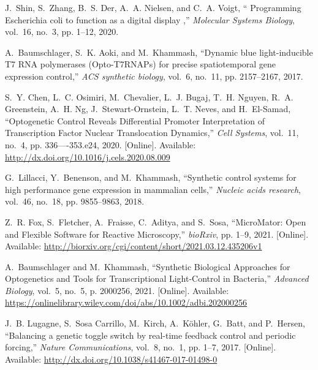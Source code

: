 \documentclass[12pt]{iopart}
\begin{document}
\begin{thebibliography}{10}
J.~Shin, S.~Zhang, B.~S. Der, A.~A. Nielsen, and C.~A. Voigt, ``{ Programming
  Escherichia coli to function as a digital display },'' \emph{Molecular
  Systems Biology}, vol.~16, no.~3, pp. 1--12, 2020.

A.~Baumschlager, S.~K. Aoki, and M.~Khammash, ``{Dynamic blue light-inducible
  T7 RNA polymerases (Opto-T7RNAPs) for precise spatiotemporal gene expression
  control},'' \emph{ACS synthetic biology}, vol.~6, no.~11, pp. 2157--2167,
  2017.

\BIBentryALTinterwordspacing
S.~Y. Chen, L.~C. Osimiri, M.~Chevalier, L.~J. Bugaj, T.~H. Nguyen, R.~A.
  Greenstein, A.~H. Ng, J.~Stewart-Ornstein, L.~T. Neves, and H.~El-Samad,
  ``{Optogenetic Control Reveals Differential Promoter Interpretation of
  Transcription Factor Nuclear Translocation Dynamics},'' \emph{Cell Systems},
  vol.~11, no.~4, pp. 336----353.e24, 2020. [Online]. Available:
  \url{http://dx.doi.org/10.1016/j.cels.2020.08.009}
\BIBentrySTDinterwordspacing

G.~Lillacci, Y.~Benenson, and M.~Khammash, ``{Synthetic control systems for
  high performance gene expression in mammalian cells},'' \emph{Nucleic acids
  research}, vol.~46, no.~18, pp. 9855--9863, 2018.

\BIBentryALTinterwordspacing
Z.~R. Fox, S.~Fletcher, A.~Fraisse, C.~Aditya, and S.~Sosa, ``{MicroMator: Open
  and Flexible Software for Reactive Microscopy},'' \emph{bioRxiv}, pp. 1--9,
  2021. [Online]. Available:
  \url{http://biorxiv.org/cgi/content/short/2021.03.12.435206v1}
\BIBentrySTDinterwordspacing

\BIBentryALTinterwordspacing
A.~Baumschlager and M.~Khammash, ``{Synthetic Biological Approaches for
  Optogenetics and Tools for Transcriptional Light-Control in Bacteria},''
  \emph{Advanced Biology}, vol.~5, no.~5, p. 2000256, 2021. [Online].
  Available:
  \url{https://onlinelibrary.wiley.com/doi/abs/10.1002/adbi.202000256}
\BIBentrySTDinterwordspacing

\BIBentryALTinterwordspacing
J.~B. Lugagne, S.~{Sosa Carrillo}, M.~Kirch, A.~K{\"{o}}hler, G.~Batt, and
  P.~Hersen, ``{Balancing a genetic toggle switch by real-time feedback control
  and periodic forcing},'' \emph{Nature Communications}, vol.~8, no.~1, pp.
  1--7, 2017. [Online]. Available:
  \url{http://dx.doi.org/10.1038/s41467-017-01498-0}
\BIBentrySTDinterwordspacing


\end{thebibliography}
\end{document}
